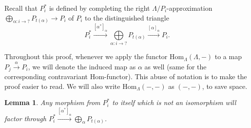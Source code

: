 \documentclass[12pt, dvipsnames, oneside]{amsart}
\newtheorem{lemma}[theorem]{Lemma}
\theoremstyle{definition}
\newcommand{\Hom}{\text{Hom}}
\begin{document}
Recall that $P_i^*$ is defined by completing the right $\Lambda/P_i$-approximation $\bigoplus\limits_{\alpha: i\rightarrow ?} P_{t(\alpha)}\rightarrow P_i$ of $P_i$ to the distinguished triangle
$$P_i^*\xrightarrow{[\alpha^*]_\alpha} \bigoplus\limits_{\alpha:i\rightarrow ?} P_{t(\alpha)}\xrightarrow{[\alpha]_\alpha} P_i.$$

Throughout this proof, whenever we apply the functor $\Hom_{\Lambda}(\Lambda, - )$ to a map $P_j\xrightarrow{\alpha} P_i$, we will denote the induced map as $\alpha$ as well (same for the corresponding contravariant $\Hom$-functor). This abuse of notation is to make the proof easier to read. We will also write $\Hom_{\Lambda}(-,-)$ as $(-,-)$, to save space. 
\bigskip\\


\begin{lemma}\label{lemma:EndPi*}
Any morphism from $P_i^*$ to itself which is not an isomorphism will factor through $P_i^*\xrightarrow{[\alpha^*]_\alpha}\bigoplus_\alpha P_{t(\alpha)}$.
\end{lemma}
\end{document}
